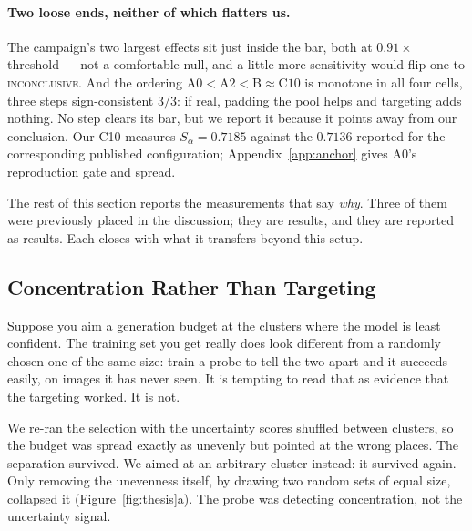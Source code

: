 \documentclass{article} %
\begin{document}
\paragraph{Two loose ends, neither of which flatters us.} The campaign's two largest effects sit just
inside the bar, both at $0.91\times$ threshold --- not a comfortable null, and a little more
sensitivity would flip one to \textsc{inconclusive}. And the ordering
$\mathrm{A0}<\mathrm{A2}<\mathrm{B}\approx\mathrm{C10}$ is monotone in all four cells, three steps
sign-consistent $3/3$: if real, padding the pool helps and targeting adds nothing. No step clears
its bar, but we report it because it points away from our conclusion. Our C10 measures
$S_\alpha = 0.7185$ against the $0.7136$ reported for the corresponding published configuration;
Appendix~\ref{app:anchor} gives A0's reproduction gate and spread.


The rest of this section reports the measurements that say \emph{why}. Three of them were
previously placed in the discussion; they are results, and they are reported as results. Each
closes with what it transfers beyond this setup.

\subsection{Concentration Rather Than Targeting}
\label{sec:res-signal}

Suppose you aim a generation budget at the clusters where the model is least confident. The training
set you get really does look different from a randomly chosen one of the same size: train a probe to
tell the two apart and it succeeds easily, on images it has never seen. It is tempting to read that
as evidence that the targeting worked. It is not.

We re-ran the selection with the uncertainty scores shuffled between clusters, so the budget was
spread exactly as unevenly but pointed at the wrong places. The separation survived. We aimed at an
arbitrary cluster instead: it survived again. Only removing the unevenness itself, by drawing two
random sets of equal size, collapsed it (Figure~\ref{fig:thesis}a). The probe was detecting
concentration, not the uncertainty signal.
\end{document}
